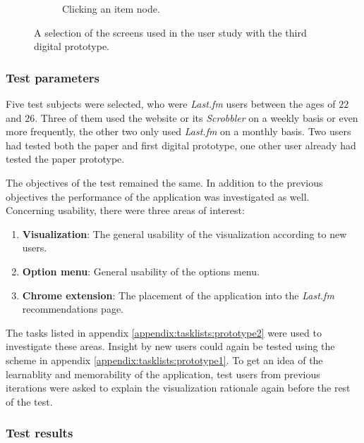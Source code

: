 \begin{figure}
\begin{subfigure}[t]{0.3\textwidth}
					\caption{Clicking an item node.}
					\label{figure:prototype_soundsuggest2_item_click}
	\end{subfigure}
	\caption{A selection of the screens used in the user study with the third digital prototype.}%
	\label{figure:prototype_soundsuggest2}%
\end{figure}



\subsubsection{Test parameters}\label{chapter:prototype:section:soundsuggest2:setup}

Five test subjects were selected, who were \emph{Last.fm} users between the ages of $22$ and $26$. Three of them used the website or its \emph{Scrobbler} on a weekly basis or even more frequently, the other two only used \emph{Last.fm} on a monthly basis. Two users had tested both the paper and first digital prototype, one other user already had tested the paper prototype.

The objectives of the test remained the same. In addition to the previous objectives the performance of the application was investigated as well. Concerning usability, there were three areas of interest:

\begin{enumerate}
	\item \textbf{Visualization}: The general usability of the visualization according to new users.
	\item \textbf{Option menu}: General usability of the options menu.
	\item \textbf{Chrome extension}: The placement of the application into the \emph{Last.fm} recommendations page.
\end{enumerate}

The tasks listed in appendix \ref{appendix:tasklists:prototype2} were used to investigate these areas. Insight by new users could again be tested using the scheme in appendix \ref{appendix:tasklists:prototype1}. To get an idea of the learnablity and memorability of the application, test users from previous iterations were asked to explain the visualization rationale again before the rest of the test.


\subsubsection{Test results}\label{chapter:prototype:section:soundsuggest2:results}

